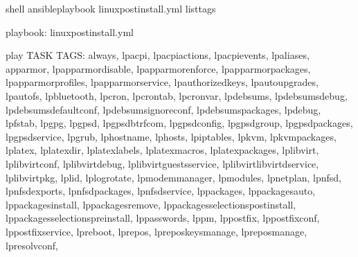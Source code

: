 \documentclass[letterpaper,10pt,english]{sphinxmanual}
\begin{document}
%
\begin{sphinxVerbatim}[commandchars=\\\{\}]
 shell\PYGZgt{} ansible\PYGZhy{}playbook linux\PYGZhy{}postinstall.yml \PYGZhy{}\PYGZhy{}list\PYGZhy{}tags

 playbook: linux\PYGZhy{}postinstall.yml

 play 
 TASK TAGS: \PYG{o}{[}always, lp\PYGZus{}acpi, lp\PYGZus{}acpi\PYGZus{}actions, lp\PYGZus{}acpi\PYGZus{}events, lp\PYGZus{}aliases,
 apparmor, lp\PYGZus{}apparmor\PYGZus{}disable, lp\PYGZus{}apparmor\PYGZus{}enforce, lp\PYGZus{}apparmor\PYGZus{}packages,
 lp\PYGZus{}apparmor\PYGZus{}profiles, lp\PYGZus{}apparmor\PYGZus{}service, lp\PYGZus{}authorized\PYGZus{}keys, lp\PYGZus{}auto\PYGZus{}upgrades,
 lp\PYGZus{}autofs, lp\PYGZus{}bluetooth, lp\PYGZus{}cron, lp\PYGZus{}cron\PYGZus{}tab, lp\PYGZus{}cron\PYGZus{}var, lp\PYGZus{}debsums,
 lp\PYGZus{}debsums\PYGZus{}debug, lp\PYGZus{}debsums\PYGZus{}default\PYGZus{}conf, lp\PYGZus{}debsums\PYGZus{}ignore\PYGZus{}conf,
 lp\PYGZus{}debsums\PYGZus{}packages, lp\PYGZus{}debug, lp\PYGZus{}fstab, lp\PYGZus{}gpg, lp\PYGZus{}gpsd, lp\PYGZus{}gpsd\PYGZus{}bt\PYGZus{}rfcom,
 lp\PYGZus{}gpsd\PYGZus{}config, lp\PYGZus{}gpsd\PYGZus{}group, lp\PYGZus{}gpsd\PYGZus{}packages, lp\PYGZus{}gpsd\PYGZus{}service, lp\PYGZus{}grub,
 lp\PYGZus{}hostname, lp\PYGZus{}hosts, lp\PYGZus{}iptables, lp\PYGZus{}kvm, lp\PYGZus{}kvm\PYGZus{}packages, lp\PYGZus{}latex,
 lp\PYGZus{}latex\PYGZus{}dir, lp\PYGZus{}latex\PYGZus{}labels, lp\PYGZus{}latex\PYGZus{}macros, lp\PYGZus{}latex\PYGZus{}packages, lp\PYGZus{}libvirt,
 lp\PYGZus{}libvirt\PYGZus{}conf, lp\PYGZus{}libvirt\PYGZus{}debug, lp\PYGZus{}libvirt\PYGZus{}guests\PYGZus{}service,
 lp\PYGZus{}libvirt\PYGZus{}libvirtd\PYGZus{}service, lp\PYGZus{}libvirt\PYGZus{}pkg, lp\PYGZus{}lid, lp\PYGZus{}logrotate, lp\PYGZus{}modemmanager,
 lp\PYGZus{}modules, lp\PYGZus{}netplan, lp\PYGZus{}nfsd, lp\PYGZus{}nfsd\PYGZus{}exports, lp\PYGZus{}nfsd\PYGZus{}packages, lp\PYGZus{}nfsd\PYGZus{}service,
 lp\PYGZus{}packages, lp\PYGZus{}packages\PYGZus{}auto, lp\PYGZus{}packages\PYGZus{}install, lp\PYGZus{}packages\PYGZus{}remove,
 lp\PYGZus{}packages\PYGZus{}selections\PYGZus{}postinstall, lp\PYGZus{}packages\PYGZus{}selections\PYGZus{}preinstall,
 lp\PYGZus{}passwords, lp\PYGZus{}pm, lp\PYGZus{}postfix, lp\PYGZus{}postfix\PYGZus{}conf, lp\PYGZus{}postfix\PYGZus{}service, lp\PYGZus{}reboot,
 lp\PYGZus{}repos, lp\PYGZus{}repos\PYGZus{}keys\PYGZus{}manage, lp\PYGZus{}repos\PYGZus{}manage, lp\PYGZus{}resolvconf,

\end{sphinxVerbatim}
\end{document}
